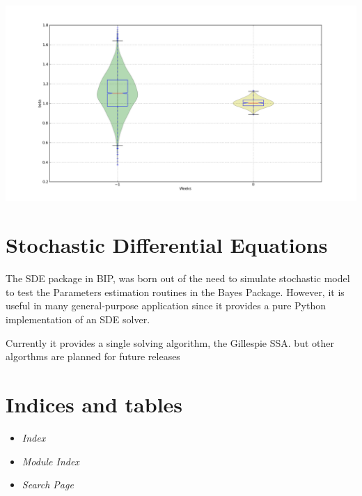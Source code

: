 \documentclass[a4paper,10pt,english]{manual}
\begin{document}
\includegraphics[width=15cm]{fit_par.png}

\resetcurrentobjects
\hypertarget{--doc-sde}{}

\chapter{Stochastic Differential Equations}

The SDE package in BIP, was born out of the need to simulate stochastic model to test the Parameters estimation routines in the Bayes Package. However, it is useful in many general-purpose application since it provides a pure Python implementation of an SDE solver.

Currently it provides a single solving algorithm, the Gillespie SSA. but other algorthms are planned for future releases


\chapter{Indices and tables}
\begin{itemize}
\item {} 
\emph{Index}

\item {} 
\emph{Module Index}

\item {} 
\emph{Search Page}

\end{itemize}


\renewcommand{\indexname}{Module Index}
\printmodindex
\renewcommand{\indexname}{Index}
\printindex
\end{document}

